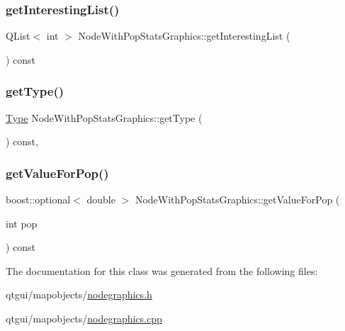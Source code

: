 \subsubsection{\texorpdfstring{getInterestingList()}{getInterestingList()}}
{\footnotesize\ttfamily Q\+List$<$ int $>$ Node\+With\+Pop\+Stats\+Graphics\+::get\+Interesting\+List (\begin{DoxyParamCaption}{ }\end{DoxyParamCaption}) const\hspace{0.3cm}{\ttfamily [protected]}}

\mbox{\label{class_node_with_pop_stats_graphics_a6e60d5d7a442456d4cd9ec5888384543}} 
\subsubsection{\texorpdfstring{getType()}{getType()}}
{\footnotesize\ttfamily \mbox{\hyperlink{class_node_with_pop_stats_graphics_aeaa9e3e8bdb1f52ee13c0516413d33fe}{Type}} Node\+With\+Pop\+Stats\+Graphics\+::get\+Type (\begin{DoxyParamCaption}{ }\end{DoxyParamCaption}) const\hspace{0.3cm}{\ttfamily [inline]}, {\ttfamily [protected]}}

\mbox{\label{class_node_with_pop_stats_graphics_abb61e050e94ad3627b359e0f71ddfefd}} 
\subsubsection{\texorpdfstring{getValueForPop()}{getValueForPop()}}
{\footnotesize\ttfamily boost\+::optional$<$ double $>$ Node\+With\+Pop\+Stats\+Graphics\+::get\+Value\+For\+Pop (\begin{DoxyParamCaption}\item[{int}]{pop }\end{DoxyParamCaption}) const\hspace{0.3cm}{\ttfamily [protected]}}



The documentation for this class was generated from the following files\+:\begin{DoxyCompactItemize}
\item 
qtgui/mapobjects/\mbox{\hyperlink{nodegraphics_8h}{nodegraphics.\+h}}\item 
qtgui/mapobjects/\mbox{\hyperlink{nodegraphics_8cpp}{nodegraphics.\+cpp}}\end{DoxyCompactItemize}
